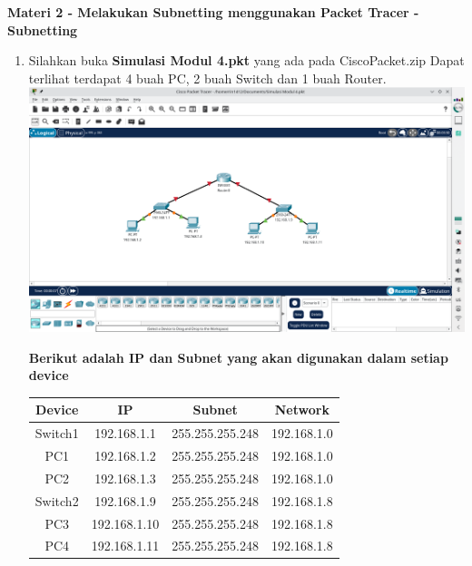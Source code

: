 \documentclass{article}
\begin{document}
    \begin{flushleft}
        \textbf{Materi 2 - Melakukan Subnetting menggunakan Packet Tracer - Subnetting}
        \newline

        \begin{enumerate}
            \item Silahkan buka \textbf{Simulasi Modul 4.pkt} yang ada pada CiscoPacket.zip
            Dapat terlihat terdapat 4 buah PC, 2 buah Switch dan 1 buah Router.
            \includegraphics[scale=0.3]{2-1.png}

            \textbf{Berikut adalah IP dan Subnet yang akan digunakan dalam setiap device}

            \begin{tabular}{|c|c|c|c|}
                \hline
                Device & IP & Subnet & Network \\
                \hline
                Switch1 & 192.168.1.1 & 255.255.255.248 & 192.168.1.0 \\
                PC1 & 192.168.1.2 & 255.255.255.248 & 192.168.1.0 \\
                PC2 & 192.168.1.3 & 255.255.255.248 & 192.168.1.0 \\
                \hline
                Switch2 & 192.168.1.9 & 255.255.255.248 & 192.168.1.8 \\
                PC3 & 192.168.1.10 & 255.255.255.248 & 192.168.1.8 \\
                PC4 & 192.168.1.11 & 255.255.255.248  & 192.168.1.8 \\
                \hline
            \end{tabular}


\end{enumerate}
\end{flushleft}
\end{document}
